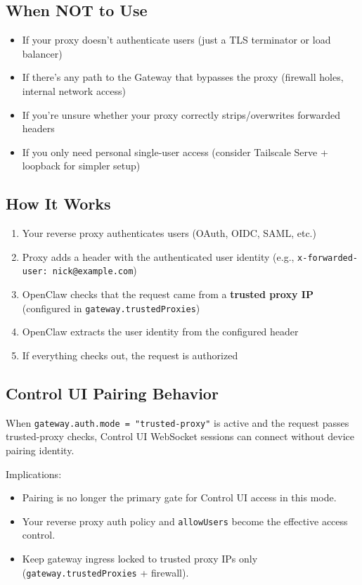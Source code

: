 \subsection{When NOT to Use}


\begin{itemize}
  \item If your proxy doesn't authenticate users (just a TLS terminator or load balancer)
  \item If there's any path to the Gateway that bypasses the proxy (firewall holes, internal network access)
  \item If you're unsure whether your proxy correctly strips/overwrites forwarded headers
  \item If you only need personal single-user access (consider Tailscale Serve + loopback for simpler setup)
\end{itemize}


\subsection{How It Works}


\begin{enumerate}
  \item Your reverse proxy authenticates users (OAuth, OIDC, SAML, etc.)
  \item Proxy adds a header with the authenticated user identity (e.g., \texttt{x-forwarded-user: nick@example.com})
  \item OpenClaw checks that the request came from a \textbf{trusted proxy IP} (configured in \texttt{gateway.trustedProxies})
  \item OpenClaw extracts the user identity from the configured header
  \item If everything checks out, the request is authorized
\end{enumerate}


\subsection{Control UI Pairing Behavior}


When \texttt{gateway.auth.mode = "trusted-proxy"} is active and the request passes
trusted-proxy checks, Control UI WebSocket sessions can connect without device
pairing identity.

Implications:

\begin{itemize}
  \item Pairing is no longer the primary gate for Control UI access in this mode.
  \item Your reverse proxy auth policy and \texttt{allowUsers} become the effective access control.
  \item Keep gateway ingress locked to trusted proxy IPs only (\texttt{gateway.trustedProxies} + firewall).
\end{itemize}


